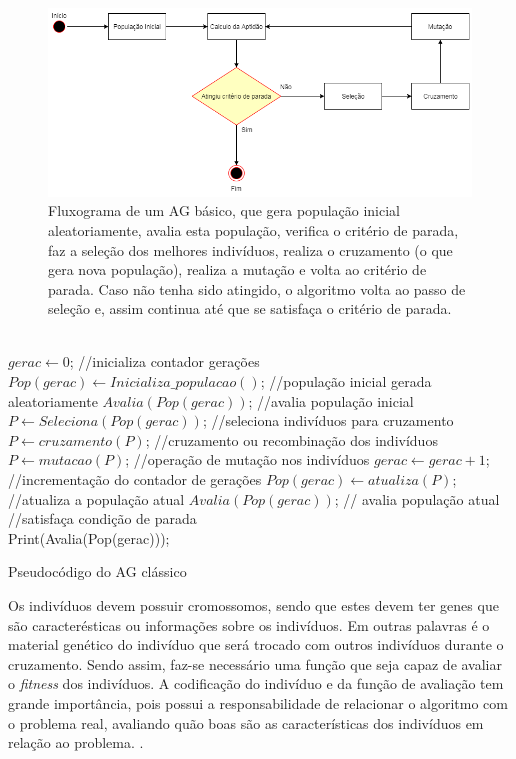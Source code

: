 \begin{figure}[htb]  	
	\centering	
	\includegraphics[width=\textwidth]{figuras/ref_007}
	\caption[Fluxograma de um AG]{Fluxograma de um AG básico, que gera população inicial aleatoriamente, avalia esta população, verifica o critério de parada, faz a seleção dos melhores indivíduos, realiza o cruzamento (o que gera nova população), realiza a mutação e volta ao critério de parada. Caso não tenha sido atingido, o algoritmo volta ao passo de seleção e, assim continua até que se satisfaça o critério de parada.} 	
	\label{figura:ref_007}
\end{figure}

\begin{algoritmo}[!htb]
	\begin{algorithmic}[1]
		\\$gerac \leftarrow 0$;    //inicializa contador gerações
		\\$Pop(gerac) \leftarrow Inicializa\_populacao()$;    //população inicial gerada aleatoriamente
		\State$Avalia(Pop(gerac))$;    //avalia população inicial
		\Repeat 
			\State$ P \leftarrow Seleciona(Pop(gerac)) $;    //seleciona indivíduos para cruzamento
			\State$ P \leftarrow cruzamento(P) $;    //cruzamento ou recombinação dos indivíduos
			\State$ P \leftarrow mutacao(P) $;    //operação de mutação nos indivíduos
			\State$ gerac \leftarrow gerac + 1 $;    //incrementação do contador de gerações
			\State$ Pop(gerac) \leftarrow atualiza(P)$; //atualiza a população atual
			\State$ Avalia(Pop(gerac))$; // avalia população atual
		\Until      //satisfaça condição de parada
		\\Print(Avalia(Pop(gerac)));
	\end{algorithmic}
	\caption{Pseudocódigo do AG clássico} \label{algoritmo:ag}
\end{algoritmo}

Os indivíduos devem possuir cromossomos, sendo que estes devem ter genes que são caracterésticas ou informações sobre os indivíduos. Em outras palavras é o material genético do indivíduo que será trocado com outros indivíduos durante o cruzamento. Sendo assim, faz-se necessário uma função que seja capaz de avaliar o \textit{fitness} dos indivíduos. A codificação do indivíduo e da função de avaliação tem grande importância, pois possui a responsabilidade de relacionar o algoritmo com o problema real, avaliando quão boas são as características dos indivíduos em relação ao problema. \cite{neto:2011:computaccao}.

